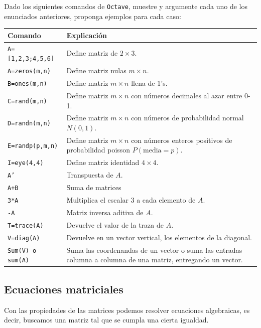 \begin{ejer}
Dado los siguientes comandos de \texttt{Octave}, muestre y argumente cada uno de los enunciados anteriores, proponga ejemplos para cada caso:
\vspace{0.5cm}
\begin{center}
\begin{tabular}{|>{\columncolor[gray]{0.8}} p{5cm}|p{10cm}|}
\hline
Comando & Explicación \\ \hline
\texttt{A=[1,2,3;4,5,6]}&  Define matriz de $2 \times 3$.\\ \hline
\texttt{A=zeros(m,n)}&  Define matriz nulas $m \times n$.\\ \hline
\texttt{B=ones(m,n)}&  Define matriz $m \times n$ llena de 1's.\\ \hline
\texttt{C=rand(m,n)}&  Define matriz $m \times n$ con números decimales al azar entre 0-1.\\ \hline
\texttt{D=randn(m,n)}&  Define matriz $m \times n$ con números de probabilidad normal $N(0,1)$. \\ \hline
\texttt{E=randp(p,m,n)} & Define matriz $m \times n$ con números enteros positivos de probabilidad poisson $P(\text{media}=p)$.\\ \hline
\texttt{I=eye(4,4)}&  Define matriz identidad $4 \times 4$.\\ \hline
\texttt{A’} & Transpuesta de $A$.\\ \hline
\texttt{A+B} & Suma de matrices\\ \hline
\texttt{3*A} & Multiplica el escalar 3 a cada elemento de $A$. \\ \hline
\texttt{-A} & Matriz inversa aditiva de $A$.\\ \hline
\texttt{T=trace(A)} & Devuelve el valor de la traza de $A$.\\ \hline
\texttt{V=diag(A)} & Devuelve en un vector vertical, los elementos de la
diagonal.\\ \hline
\texttt{Sum(V) o sum(A)} & Suma las coordenandas de un vector o suma las entradas columna a columna
de una matriz, entregando un vector.\\ \hline
\end{tabular}
\end{center}
\end{ejer}
\vspace{1.5cm}

\subsection{Ecuaciones matriciales}
Con las propiedades de las matrices podemos resolver ecuaciones algebraicas, es decir, buscamos una matriz tal que se cumpla una cierta igualdad.

